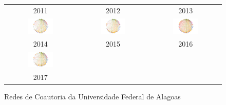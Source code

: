 \begin{figure}[H]
\begin{tabular}{ccc}
		2011 & 2012 & 2013\\[6pt]
		\includegraphics[width=0.38\textwidth]{Imagens/rede-al-2014.pdf} &
		\includegraphics[width=0.38\textwidth]{Imagens/rede-al-2015.pdf} &
		\includegraphics[width=0.38\textwidth]{Imagens/rede-al-2016.pdf} \\
		2014 & 2015 & 2016\\[6pt]  \includegraphics[width=0.38\textwidth]{Imagens/rede-al-2017.pdf} & & \\
		2017 & & \\
	\end{tabular}
	\caption{Redes de Coautoria da Universidade Federal de Alagoas}
\end{figure}




